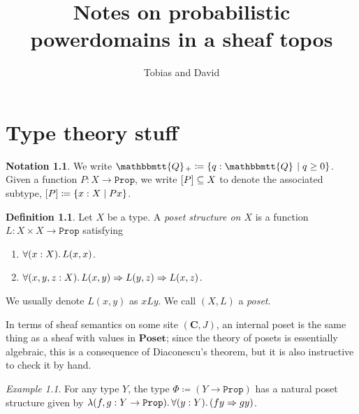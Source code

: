 \documentclass[11pt, oneside, article]{memoir}
\theoremstyle{plain}
\theoremstyle{definition}
\newtheorem{definition}[theorem]{Definition}
\newtheorem{notation}[theorem]{Notation}
\theoremstyle{remark}
\newtheorem{example}[theorem]{Example}
\renewcommand{\ss}{\subseteq}
\DeclarePairedDelimiter{\subtype}{[}{]}
\newcommand{\const}[1]{\mathtt{#1}}
\newcommand{\Cat}[1]{\mathbf{#1}}
\newcommand{\internal}[1]{\raisebox{-.03ex}{$\mathbbmtt{#1}$}}
\newcommand{\hs}{\hspace{1.1pt}}
\newcommand{\tQQ}{\internal{Q}\hs}
\newcommand{\tQQp}{\tQQ_{+}}
\newcommand{\Prop}{\const{Prop}}
\newcommand{\Poset}{\Cat{Poset}}
\renewcommand{\C}{\Cat{C}}
\newcommand{\imp}{\Rightarrow}
\begin{document}
\title{Notes on probabilistic powerdomains in a sheaf topos}

\author{Tobias and David}

\maketitle

\tableofcontents*


\chapter{Type theory stuff}

\begin{notation}
We write $\tQQp\coloneqq\{q:\tQQ\mid q\geq0\}$. Given a function $P:X\to\Prop$, we write $\subtype{P}\ss X$ to denote the associated subtype, $\subtype{P}\coloneqq\{x:X\mid Px\}$.
\end{notation}

\begin{definition}
Let $X$ be a type. A \emph{poset structure on $X$} is a function $L:X\times X\to\Prop$ satisfying
\begin{enumerate}
	\item $\forall(x:X)\ldotp L(x,x)$.
	\item $\forall(x,y,z:X)\ldotp L(x,y)\imp L(y,z)\imp L(x,z)$.
\end{enumerate}
We usually denote $L(x,y)$ as $x L y$. We call $(X,L)$ a \emph{poset}.
\end{definition}

In terms of sheaf semantics on some site $(\C,J)$, an internal poset is the same thing as a sheaf with values in $\Poset$; since the theory of posets is essentially algebraic, this is a consequence of Diaconescu's theorem, but it is also instructive to check it by hand.

\begin{example}
For any type $Y$, the type $\Phi\coloneqq (Y\to\Prop)$ has a natural poset structure given by $\lambda(f,g:Y\to\Prop)\ldotp\forall(y:Y)\ldotp (fy\imp gy)$.
\end{example}
\end{document}
